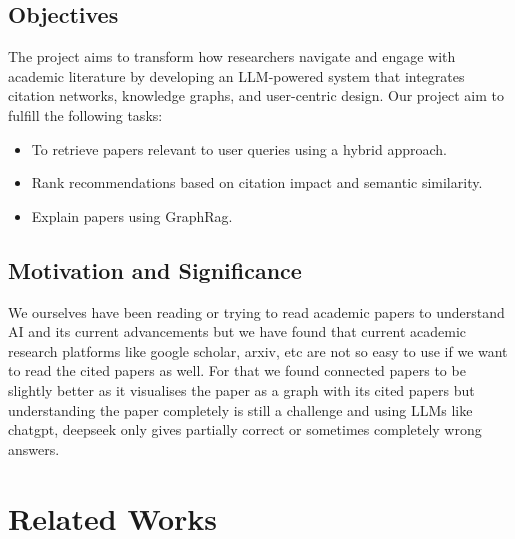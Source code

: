 \documentclass[a4paper,12pt]{article}
\begin{document}
\subsection{Objectives}
The project aims to transform how researchers navigate and engage with academic
literature by developing an LLM-powered system that integrates citation networks,
knowledge graphs, and user-centric design. Our project aim to fulfill the following tasks:
\vspace{-25pt}
\begin{itemize}
    \item To retrieve papers relevant to user queries using a hybrid approach.
    \vspace{-10pt}
    \item Rank recommendations based on citation impact and semantic similarity.
    \vspace{-10pt}
    \item Explain papers using GraphRag.
\end{itemize}

\subsection{Motivation and Significance}
We ourselves have been reading or trying to read academic papers to understand AI
and its current advancements but we have found that current academic research platforms
like google scholar, arxiv, etc are not so easy to use if we want to read the cited
papers as well. For that we found connected papers to be slightly better as it
visualises the paper as a graph with its cited papers but understanding the paper
completely is still a challenge and using LLMs like chatgpt, deepseek only gives
partially correct or sometimes completely wrong answers.
\newpage

\section{Related Works}
\end{document}
